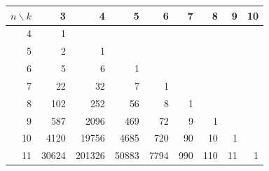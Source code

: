 \begin{tabular}{@{}r|rrrrrrrr@{}}
\toprule
$n\backslash k$&3&4&5&6&7&8&9&10\\
\midrule
4&1&&&&&&&\\
5&2&1&&&&&&\\
6&5&6&1&&&&&\\
7&22&32&7&1&&&&\\
8&102&252&56&8&1&&&\\
9&587&2096&469&72&9&1&&\\
10&4120&19756&4685&720&90&10&1&\\
11&30624&201326&50883&7794&990&110&11&1\\
\bottomrule
\end{tabular}
